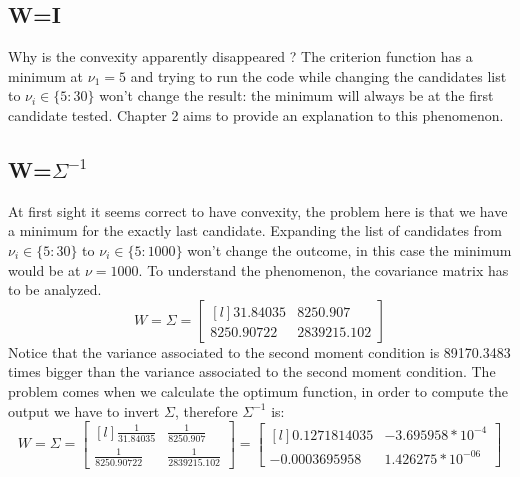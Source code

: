 \subsection{W=I}
Why is the convexity apparently disappeared ? The criterion function has a minimum at $\nu_1=5$ and trying to run the code while changing the candidates list to $\nu_i \in \{5:30\}$ won't change the result: the minimum will always be at the first candidate tested. Chapter 2 aims to provide an explanation to this phenomenon.

\subsection{W=$\Sigma^{-1}$}
At first sight it seems correct to have convexity, the problem here is that we have a minimum for the exactly last candidate. Expanding the list of candidates from $\nu_i \in \{5:30\}$ to $\nu_i \in \{5:1000\}$ won't change the outcome, in this case the minimum would be at $\nu=1000$. To understand the phenomenon, the covariance matrix has to be analyzed.
\begin{equation*}
    W=\Sigma=
    \begin{bmatrix}[l]
        31.84035    &8250.907 \\
        8250.90722  &2839215.102
        \end{bmatrix}
\end{equation*}
Notice that the variance associated to the second moment condition is 89170.3483 times bigger than the variance associated to the second moment condition. The problem comes when we calculate the optimum function, in order to compute the output we have to invert $\Sigma$, therefore $\Sigma^{-1}$ is:
\begin{equation*}
    W=\Sigma=
    \begin{bmatrix}[l]
        \frac{1}{31.84035}    &\frac{1}{8250.907} \\
        \frac{1}{8250.90722}  &\frac{1}{2839215.102}
        \end{bmatrix}=
    \begin{bmatrix}[l]
        0.1271814035    &-3.695958*10^{-4} \\
        -0.0003695958    &1.426275*10^{-06}
    \end{bmatrix}
\end{equation*}





\newpage

